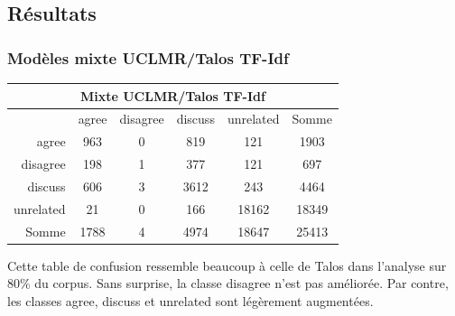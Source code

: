 \documentclass[11pt,a4paper,oldfontcommands]{memoir}
\begin{document}
\subsection{Résultats}

\subsubsection{Modèles mixte UCLMR/Talos TF-Idf}

\begin{center}
 \begin{tabular}{ r | c c c c | c }
  \multicolumn{6}{c}{Mixte UCLMR/Talos TF-Idf}               \\
  \hline
            & agree & disagree & discuss & unrelated & Somme \\
  \hline
  agree     & 963   & 0        & 819     & 121       & 1903  \\
  disagree  & 198   & 1        & 377     & 121       & 697   \\
  discuss   & 606   & 3        & 3612    & 243       & 4464  \\
  unrelated & 21    & 0        & 166     & 18162     & 18349 \\
  \hline
  Somme     & 1788  & 4        & 4974    & 18647     & 25413 \\
 \end{tabular}
\end{center}
Cette table de confusion ressemble beaucoup à celle de Talos dans l'analyse sur 80\% du corpus.
Sans surprise, la classe disagree n'est pas améliorée.
Par contre, les classes agree, discuss et unrelated sont légèrement augmentées.
\end{document}
